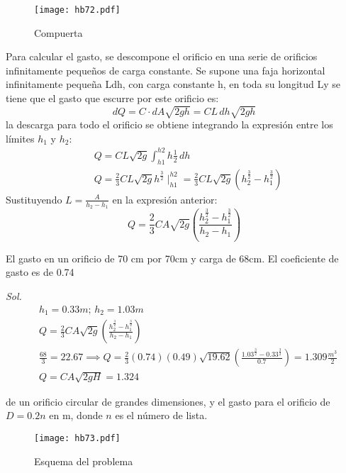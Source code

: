 \begin{figure}[h!]
\centering
  \texttt{[image: hb72.pdf]}
  \caption{Compuerta}
  \label{hb72}
\end{figure}
Para calcular el gasto, se descompone el orificio en una serie de orificios infinitamente pequeños de carga constante. Se supone una faja horizontal infinitamente pequeña Ldh, con carga constante h, en toda su longitud Ly se tiene que el gasto que escurre por este orificio es:
\begin{equation}
    dQ = C\cdot dA \sqrt{2gh} = CL\,dh \sqrt{2gh}
\end{equation}
la descarga para todo el orificio se obtiene integrando la expresión entre los límites $h_1$ y $h_2$:
\begin{align*}
    &Q = CL \sqrt{2g} \int_{h1}^{h2} h{\frac{1}{2}}\,dh\\
    &Q = \frac{2}{3}CL \sqrt{2g}h^{\frac{3}{2}}\mid_{h1}^{h2} = \frac{2}{3}CL \sqrt{2g}\left(h_2^{\frac{3}{2}} -h_1^{\frac{3}{2}}\right)
\end{align*}
Sustituyendo $L= \frac{A}{h_2-h_1}$ en la expresión anterior:
\begin{equation}
    Q = \frac{2}{3}CA \sqrt{2g}\left(\frac{h_2^{\frac{3}{2}} - h_1^{\frac{3}{2}}}{h_2 - h_1}\right)
\end{equation}

\begin{example}
    El gasto en un orificio de 70 cm por 70cm y carga de 68cm. El coeficiente de gasto es de 0.74
\end{example}
\textit{ Sol. }
\begin{align*}
    &h_1 =0.33m;\, h_2 = 1.03m\\
    &Q = \frac{2}{3}CA \sqrt{2g}\left(\frac{h_2^{\frac{3}{2}} - h_1^{\frac{3}{2}}}{h_2 - h_1}\right)\\ 
    &\frac{68}{3}= 22.67\implies Q = \frac{2}{3}(0.74)(0.49)\sqrt{19.62}\left(\frac{1.03^{\frac{3}{2}} - 0.33^{\frac{3}{2}}}{0.7}\right) = 1.309 \frac{m^3}{2}\\ 
    &Q = CA \sqrt{2gH} = 1.324
\end{align*}

\begin{problem}
    de un orificio circular de grandes dimensiones, y el gasto para el orificio de $D=0.2n$ en m, donde $n$ es el número de lista.
\end{problem}
\begin{figure}[h!]
\centering
  \texttt{[image: hb73.pdf]}
  \caption{Esquema del problema}
  \label{hb73}
\end{figure}


